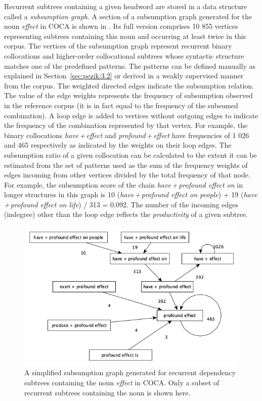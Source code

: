 \documentclass[output=paper]{langscibook}
\begin{document}
Recurrent subtrees containing a given headword are stored in a data structure called a \textit{subsumption graph}. A section of a subsumption graph generated for the noun \textit{effect} in COCA is shown in . Its full version comprises 10 855 vertices representing subtrees containing this noun and occurring at least twice in this corpus. The vertices of the subsumption graph represent recurrent binary collocations and higher-order collocational subtrees whose syntactic structure matches one of the predefined patterns. The patterns can be defined manually as explained in Section~\ref{sec:pezik:3.2} or derived in a weakly supervised manner from the corpus. The weighted directed edges indicate the subsumption relation. The value of the edge weights represents the frequency of subsumption observed in the reference corpus (it is in fact equal to the frequency of the subsumed combination). A loop edge is added to vertices without outgoing edges to indicate the frequency of the combination represented by that vertex. For example, the binary collocations \textit{have\,+\,effect} and \textit{profound\,+\,effect} have frequencies of 1 026 and 465 respectively as indicated by the weights on their loop edges. The subsumption ratio of a given collocation can be calculated to the extent it can be estimated from the set of patterns used as the sum of the frequency weights of edges incoming from other vertices divided by the total frequency of that node. For example, the subsumption score of the chain \textit{have\,+\,profound effect on} in longer structures in this graph is 10 (\textit{have\,+\,profound effect on people}) + 19 (\textit{have\,+\,profound effect on life}) / 313 = 0.092. The number of the incoming edges (indegree) other than the loop edge reflects the \textit{productivity} of a given subtree. 

  
\begin{figure}
\includegraphics[width=\textwidth]{figures/pezik-img001.png}
\caption{A simplified subsumption graph generated for recurrent dependency subtrees containing the noun \textit{effect} in COCA. Only a subset of recurrent subtrees containing the noun is shown here.\label{fig:pezik:1}}
\end{figure}
\end{document}
